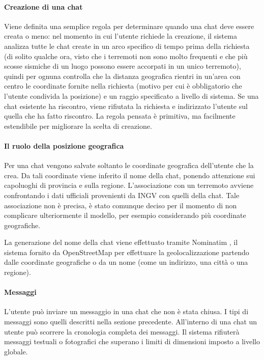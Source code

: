 \paragraph{Creazione di una chat} Viene definita una semplice regola per determinare quando una chat deve essere creata o meno: nel momento in cui l'utente richiede la creazione, il sistema analizza tutte le chat create in un arco specifico di tempo prima della richiesta (di solito qualche ora, visto che i terremoti non sono molto frequenti e che più scosse sismiche di un luogo possono essere accorpati in un unico terremoto), quindi per ognuna controlla che la distanza geografica rientri in un'area con centro le coordinate fornite nella richiesta (motivo per cui è obbligatorio che l'utente condivida la posizione) e un raggio specificato a livello di sistema. Se una chat esistente ha riscontro, viene rifiutata la richiesta e indirizzato l'utente sul quella che ha fatto riscontro. La regola pensata è primitiva, ma facilmente estendibile per migliorare la scelta di creazione.

\paragraph{Il ruolo della posizione geografica} Per una chat vengono salvate soltanto le coordinate geografica dell'utente che la crea. Da tali coordinate viene inferito il nome della chat, ponendo attenzione sui capoluoghi di provincia e sulla regione. L'associazione con un terremoto avviene confrontando i dati ufficiali provenienti da INGV \cite{ingv-data} con quelli della chat. Tale associazione non è precisa, è stato comunque deciso per il momento di non complicare ulteriormente il modello, per esempio considerando più coordinate geografiche.

La generazione del nome della chat viene effettuato tramite Nominatim \cite{nominatim}, il sistema fornito da OpenStreetMap per effettuare la geolocalizzazione partendo dalle coordinate geografiche o da un nome (come un indirizzo, una città o una regione).

\paragraph{Messaggi} L'utente può inviare un messaggio in una chat che non è stata chiusa. I tipi di messaggi sono quelli descritti nella sezione precedente. All'interno di una chat un utente può scorrere la cronologia completa dei messaggi. Il sistema rifiuterà messaggi testuali o fotografici che superano i limiti di dimensioni imposto a livello globale.

